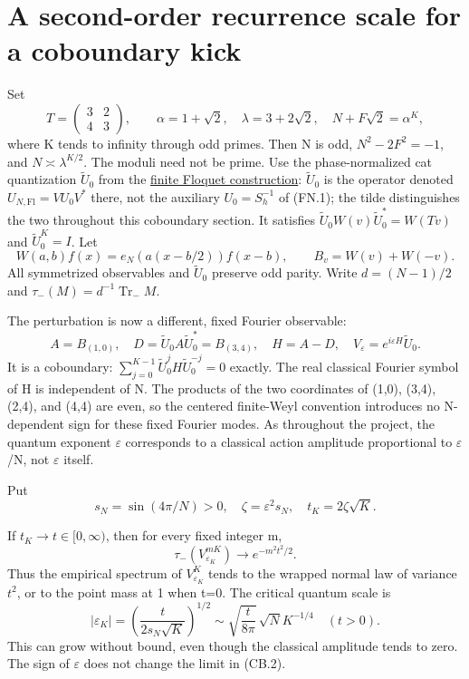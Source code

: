 \section{A second-order recurrence scale for a coboundary kick}\label{sec:coboundary}
Set \[
 T=\begin{pmatrix}3&2\\4&3\end{pmatrix},\qquad
 \alpha=1+\sqrt2,\quad \lambda=3+2\sqrt2,\quad
 N+F\sqrt2=\alpha^K,
\] where K tends to infinity through odd primes. Then N is odd, \(N^2-2F^2=-1\), and \(N\asymp\lambda^{K/2}\). The moduli need not be prime. Use the phase-normalized cat quantization \(\widetilde U_0\) from the \hyperref[sec:floquet]{finite Floquet construction}: \(\widetilde U_0\) is the operator denoted \(U_{N,\mathrm{Fl}}=VU_0V^*\) there, not the auxiliary \(U_0=S_h^{-1}\) of (FN.1); the tilde distinguishes the two throughout this coboundary section. It satisfies \(\widetilde U_0W(v)\widetilde U_0^*=W(Tv)\) and \(\widetilde U_0^K=I\). Let \[
 W(a,b)f(x)=e_N(a(x-b/2))f(x-b),\qquad B_v=W(v)+W(-v).
\] All symmetrized observables and \(\widetilde U_0\) preserve odd parity. Write \(d=(N-1)/2\) and \(\tau_-(M)=d^{-1}\operatorname{Tr}_{-}M\).

The perturbation is now a different, fixed Fourier observable: \[
 A=B_{(1,0)},\quad D=\widetilde U_0A\widetilde U_0^*=B_{(3,4)},\quad
 H=A-D,\quad V_\varepsilon=e^{i\varepsilon H}\widetilde U_0.                 \tag{CB.1}
\] It is a coboundary: \(\sum_{j=0}^{K-1}\widetilde U_0^jH\widetilde U_0^{-j}=0\) exactly. The real classical Fourier symbol of H is independent of N. The products of the two coordinates of (1,0), (3,4), (2,4), and (4,4) are even, so the centered finite-Weyl convention introduces no N-dependent sign for these fixed Fourier modes. As throughout the project, the quantum exponent \(\varepsilon\) corresponds to a classical action amplitude proportional to \(\varepsilon\)/N, not \(\varepsilon\) itself.

Put \[
 s_N=\sin(4\pi/N)>0,\quad \zeta=\varepsilon^2s_N,\quad
 t_K=2\zeta\sqrt K.
\]
\begin{theorem}\label{pass1:ch07_coboundary_resonance-1} If \(t_K\to t\in[0,\infty)\), then for every fixed integer m, \[
 \tau_-(V_{\varepsilon_K}^{mK})\longrightarrow e^{-m^2t^2/2}.     \tag{CB.2}
\] Thus the empirical spectrum of \(V_{\varepsilon_K}^K\) tends to the wrapped normal law of variance \(t^2\), or to the point mass at 1 when t=0. The critical quantum scale is \[
 |\varepsilon_K|=\left(\frac{t}{2s_N\sqrt K}\right)^{1/2}
 \sim\sqrt{\frac{t}{8\pi}}\,\sqrt N K^{-1/4}\quad(t>0).         \tag{CB.3}
\] This can grow without bound, even though the classical amplitude tends to zero. The sign of \(\varepsilon\) does not change the limit in (CB.2).
\end{theorem}

